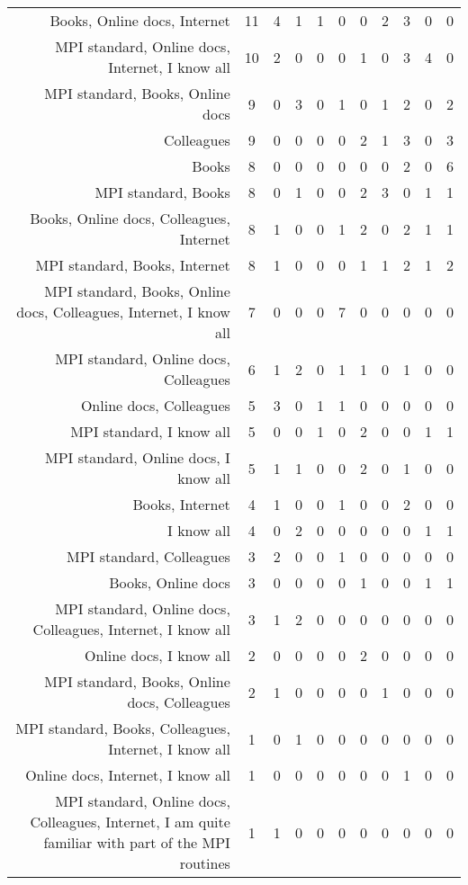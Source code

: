 {\begin{landscape}
\begin{longtable}[htb]{r|c|c|c|c|c|c|c|c|c|c}
{Books, Online docs, Internet} & 11 & 4 & 1 & 1 & 0 & 0 & 2 & 3 & 0 & 0 \\%
{MPI standard, Online docs, Internet, I know all} & 10 & 2 & 0 & 0 & 0 & 1 & 0 & 3 & 4 & 0 \\%
{MPI standard, Books, Online docs} & 9 & 0 & 3 & 0 & 1 & 0 & 1 & 2 & 0 & 2 \\%
{Colleagues} & 9 & 0 & 0 & 0 & 0 & 2 & 1 & 3 & 0 & 3 \\%
{Books} & 8 & 0 & 0 & 0 & 0 & 0 & 0 & 2 & 0 & 6 \\%
{MPI standard, Books} & 8 & 0 & 1 & 0 & 0 & 2 & 3 & 0 & 1 & 1 \\%
{Books, Online docs, Colleagues, Internet} & 8 & 1 & 0 & 0 & 1 & 2 & 0 & 2 & 1 & 1 \\%
{MPI standard, Books, Internet} & 8 & 1 & 0 & 0 & 0 & 1 & 1 & 2 & 1 & 2 \\%
{MPI standard, Books, Online docs, Colleagues, Internet, I know all} & 7 & 0 & 0 & 0 & 7 & 0 & 0 & 0 & 0 & 0 \\%
{MPI standard, Online docs, Colleagues} & 6 & 1 & 2 & 0 & 1 & 1 & 0 & 1 & 0 & 0 \\%
{Online docs, Colleagues} & 5 & 3 & 0 & 1 & 1 & 0 & 0 & 0 & 0 & 0 \\%
{MPI standard, I know all} & 5 & 0 & 0 & 1 & 0 & 2 & 0 & 0 & 1 & 1 \\%
{MPI standard, Online docs, I know all} & 5 & 1 & 1 & 0 & 0 & 2 & 0 & 1 & 0 & 0 \\%
{Books, Internet} & 4 & 1 & 0 & 0 & 1 & 0 & 0 & 2 & 0 & 0 \\%
{I know all} & 4 & 0 & 2 & 0 & 0 & 0 & 0 & 0 & 1 & 1 \\%
{MPI standard, Colleagues} & 3 & 2 & 0 & 0 & 1 & 0 & 0 & 0 & 0 & 0 \\%
{Books, Online docs} & 3 & 0 & 0 & 0 & 0 & 1 & 0 & 0 & 1 & 1 \\%
{MPI standard, Online docs, Colleagues, Internet, I know all} & 3 & 1 & 2 & 0 & 0 & 0 & 0 & 0 & 0 & 0 \\%
{Online docs, I know all} & 2 & 0 & 0 & 0 & 0 & 2 & 0 & 0 & 0 & 0 \\%
{MPI standard, Books, Online docs, Colleagues} & 2 & 1 & 0 & 0 & 0 & 0 & 1 & 0 & 0 & 0 \\%
{MPI standard, Books, Colleagues, Internet, I know all} & 1 & 0 & 1 & 0 & 0 & 0 & 0 & 0 & 0 & 0 \\%
{Online docs, Internet, I know all} & 1 & 0 & 0 & 0 & 0 & 0 & 0 & 1 & 0 & 0 \\%
{MPI standard, Online docs, Colleagues, Internet, I am quite familiar with part of the MPI routines} & 1 & 1 & 0 & 0 & 0 & 0 & 0 & 0 & 0 & 0 \\%

\end{longtable}
\end{landscape}}
